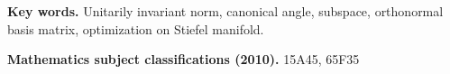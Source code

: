 \documentclass[11pt]{article}
\def\cX{{\cal X}}
\DeclareMathOperator{\tr}{tr}
\DeclareMathOperator{\T}{T}
\def\wtd{\widetilde}
\theoremstyle{definition}
\numberwithin{equation}{section}
\numberwithin{figure}{section}
\numberwithin{table}{section}
\begin{document}
\begin{abstract}
%
\end{abstract}

\medskip
{\small
{\bf Key words.} Unitarily invariant norm, canonical angle, subspace,
orthonormal basis matrix,  optimization on Stiefel manifold.

\medskip
{\bf Mathematics subject classifications (2010).} 15A45, 65F35
}
\end{document}
